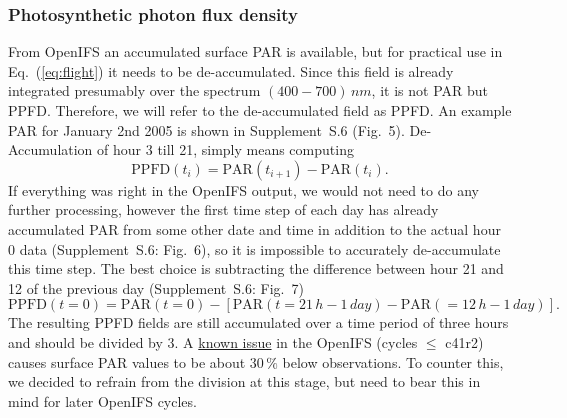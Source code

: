 \documentclass[gmd, manuscript]{copernicus}
\begin{document}
\subsubsection{Photosynthetic photon flux density}
From OpenIFS an accumulated surface PAR is available, but for practical use in Eq.~(\ref{eq:flight}) it needs to be de-accumulated. Since this field is already integrated presumably over the spectrum $(400-700)\,\unit{nm}$, it is not PAR but PPFD. Therefore, we will refer to the de-accumulated field as PPFD. An example PAR for January 2nd 2005 is shown in Supplement~S.6 (Fig.~5). De-Accumulation of hour 3 till 21, simply means computing
\begin{equation}
  \text{PPFD}(t_i) = \text{PAR}(t_{i+1})-\text{PAR}(t_i).
\end{equation}
If everything was right in the OpenIFS output, we would not need to do any further processing, however the first time step of each day has already accumulated PAR from some other date and time in addition to the actual hour 0 data (Supplement~S.6: Fig.~6), so it is impossible to accurately de-accumulate this time step. The best choice is subtracting the difference between hour 21 and 12 of the previous day (Supplement~S.6: Fig.~7)
%
\begin{equation}
  \text{PPFD}(t=0) = \text{PAR}(t=0) - \left[\text{PAR}(t=21\,\unit{h}-1\,\unit{day})-\text{PAR}(=12\,\unit{h}-1\,\unit{day})\right].
\end{equation}
%
The resulting PPFD fields are still accumulated over a time period of three hours and should be divided by $3$. A \href{https://confluence.ecmwf.int/display/CKB/ERA-Interim\%3A+surface+photosynthetically+active+radiation+\%28surface+PAR\%29+values+are+too+low}{known issue} in the OpenIFS (cycles $\le$ c41r2) causes surface PAR values to be about $30\,\unit{\%}$ below observations. To counter this, we decided to refrain from the division at this stage, but need to bear this in mind for later OpenIFS cycles.
\end{document}
